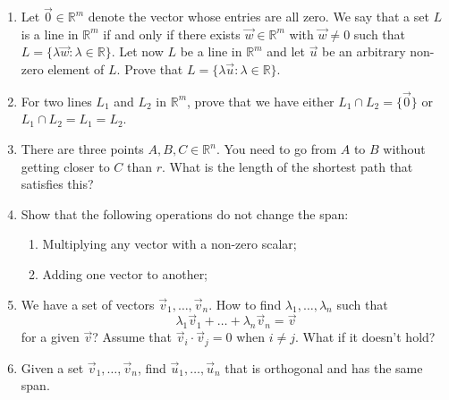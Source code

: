 \documentclass{article}
\begin{document}
\begin{enumerate}
    \item Let $\vec 0 \in \mathbb R^m$ denote the vector whose entries are all zero. We say that a set $L$ is a line in $\mathbb R^m$
if and only if there exists $\vec w \in \mathbb R^m$ with $\vec w \neq 0$ such that $L = \{\lambda \vec w : \lambda \in \mathbb R\}$. Let now $L$ be a line in $\mathbb R^m$ and let $\vec u$ be an arbitrary non-zero element of $L$. Prove that $L = \{\lambda \vec u : \lambda \in \mathbb R\}$.
\item For two lines $L_1$ and $L_2$ in $\mathbb R^m$, prove that we have either $L_1 \cap L_2 = \{\vec 0\}$ or $L_1 \cap L_2 =
L_1 = L_2$.
\item There are three points $A,B,C \in \mathbb R^n$. You need to go from $A$ to $B$ without getting closer to $C$ than $r$. What is the length of the shortest path that satisfies this?
\item Show that the following operations do not change the span:
\begin{enumerate}
    \item Multiplying any vector with a non-zero scalar;
    \item Adding one vector to another;
\end{enumerate}
\item We have a set of vectors $\vec v_1,\dots,\vec v_n$. How to find $\lambda_1,\dots,\lambda_n$ such that
$$
\lambda_1 \vec v_1 + \dots + \lambda_n \vec v_n = \vec v
$$
for a given $\vec v$? Assume that $\vec v_i \cdot \vec v_j = 0$ when $i \neq j$. What if it doesn't hold?
\item Given a set $\vec v_1, \dots, \vec v_n$, find $\vec u_1, \dots, \vec u_n$ that is orthogonal and has the same span.
\end{enumerate}
\end{document}
